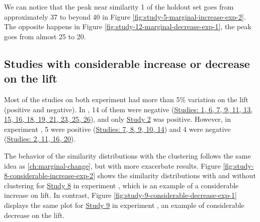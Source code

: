 We can notice that the peak near similarity 1 of the holdout set goes from approximately 37 to beyond 40 in Figure \ref{fig:study-5-marginal-increase-exp-2}. The opposite happens in Figure \ref{fig:study-12-marginal-decrease-exp-1}, the peak goes from almost 25 to 20.

\subsection{Studies with considerable increase or decrease on the lift}
\label{ch:considerable-change}

Most of the studies on both experiment had more than 5\% variation on the lift (positive and negative). In \nameExperimentI{}, 14 of them were negative (\underline{Studies: 1, 6, 7, 9, 11, 13, 15, 16, 18, 19, 21, 23, 25, 26}), and only \underline{Study 2} was positive. However, in experiment \nameExperimentII{}, 5 were positive (\underline{Studies: 7, 8, 9, 10, 14}) and 4 were negative (\underline{Studies: 2, 11, 16, 20}).

The behavior of the similarity distributions with the clustering follows the same idea as \ref{ch:marginal-change}, but with more exacerbate results. Figure \ref{fig:study-8-considerable-increase-exp-2} shows the similarity distributions with and without clustering for \underline{Study 8} in experiment \nameExperimentII{}, which is an example of a considerable increase on lift. In contrast, Figure \ref{fig:study-9-considerable-decrease-exp-1} displays the same plot for \underline{Study 9} in experiment \nameExperimentI{}, an example of considerable decrease on the lift.

